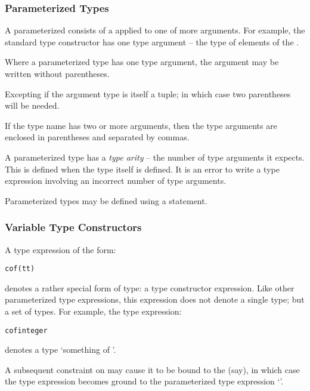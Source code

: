 \subsubsection{Parameterized Types}
\label{parameterizedType}

A parameterized  consists of a  applied to one of more  arguments. For example, the standard  type constructor has one type argument -- the type of elements of the .

Where a parameterized type has one type argument, the argument may be written without parentheses.
\begin{aside}
Excepting if the argument type is itself a tuple; in which case two parentheses will be needed.
\end{aside}
If the type name has two or more arguments, then the type arguments are enclosed in parentheses and separated by commas.

A parameterized type has a \emph{type arity} -- the number of type arguments it expects. This is defined when the type itself is defined. It is an error to write a type expression involving an incorrect number of type arguments.

Parameterized types may be defined using a  statement.

\subsubsection{Variable Type Constructors}
\label{variableConstructor}

A type expression of the form:
\begin{alltt}
\pcent{}\pcent{}c of (\pcent{}t\sequence{,}\pcent{}t\subn)
\end{alltt}
denotes a rather special form of type: a type constructor expression. Like other parameterized type expressions, this expression does not denote a single type; but a set of types. For example, the type expression:
\begin{alltt}
\pcent{}\pcent{}c of integer
\end{alltt}
denotes a type `something of '.

A subsequent constraint on  may cause it to be bound to the   (say), in which case the type expression becomes ground to the parameterized type expression `'.

